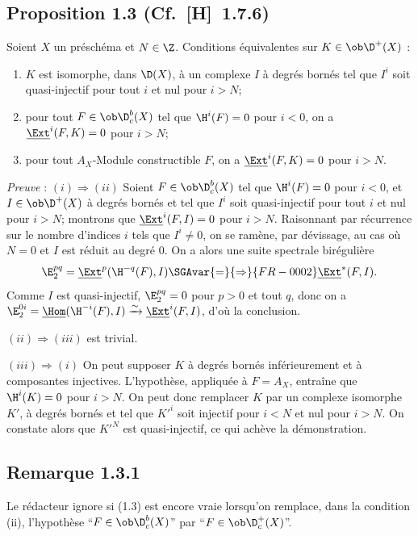 \subsection*{Proposition 1.3 {\normalfont (Cf.~[H]~1.7.6)}}
Soient $X$ un préschéma et $N \in \Z$. Conditions équivalentes sur $K \in \ob \D^{+}(X)$ :
\begin{enumerate}[label=(\roman*)]
\item $K$ est isomorphe, dans $\D(X)$, à un complexe $I$ à degrés bornés tel que $I^i$ soit quasi-injectif pour tout $i$ et nul pour $i > N$;
\item pour tout $F \in \ob \D_c^{b}(X)$ tel que $\H^i(F) = 0$ pour $i < 0$, on a $\underline{\Ext}^i(F,K) = 0$ pour $i > N$;
\item pour tout $A_X$-Module constructible $F$, on a $\underline{\Ext}^i(F,K) = 0$ pour $i > N$.
\end{enumerate}

\emph{Preuve} : $(i) \Rightarrow (ii)$ Soient $F \in \ob \D_c^{b}(X)$ tel que $\H^i(F) = 0$ pour $i < 0$, et $I \in \ob \D^{+}(X)$ à degrés bornés et tel que $I^i$ soit quasi-injectif pour tout $i$ et nul pour $i > N$; montrons que $\underline{\Ext}^i(F,I) = 0$ pour $i > N$. Raisonnant par récurrence sur le nombre d'indices $i$ tels que $I^i \neq 0$, on se ramène, par dévissage, au cas où $N = 0$ et $I$ est réduit au degré $0$. On a alors une suite spectrale birégulière
\[
\E_2^{pq} = \underline{\Ext}^p(\H^{-q}(F),I) \SGAvar{=}{\Rightarrow}{FR-0002} \underline{\Ext}^{*}(F,I).
\]
Comme $I$ est quasi-injectif, $\E_2^{pq} = 0$ pour $p > 0$ et tout $q$, donc on a $\E_2^{0i} = \underline{\Hom}(\H^{-i}(F),I) \xrightarrow{\sim} \underline{\Ext}^i(F,I)$, d'où la conclusion.

$(ii) \Rightarrow (iii)$ est trivial.

$(iii) \Rightarrow (i)$ On peut supposer $K$ à degrés bornés inférieurement et à
composantes injectives. L'hypothèse, appliquée à $F = A_X$, entraîne que $\H^i(K) = 0$ pour $i > N$. On peut donc remplacer $K$ par un complexe isomorphe $K'$, à degrés bornés et tel que $K'^i$ soit injectif pour $i < N$ et nul pour $i > N$. On constate alors que $K'^N$ est quasi-injectif, ce qui achève la démonstration.

\subsection*{Remarque 1.3.1}
Le rédacteur ignore si (1.3) est encore vraie lorsqu'on remplace, dans la condition (ii), l'hypothèse ``$F \in \ob \D_c^{b}(X)$'' par ``$F \in \ob \D_c^{+}(X)$''.

